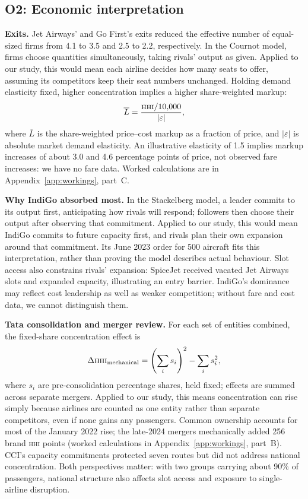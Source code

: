 \documentclass[12pt,a4paper]{article}
\newcommand{\HHI}{\textnormal{\textsc{hhi}}}
\newenvironment{mycontribution}{\par\color{blue}\captionsetup{font+={color=blue}}}{\par}
\begin{document}
\begin{mycontribution}
\subsection{O2: Economic interpretation}
\textbf{Exits.} Jet Airways' and Go First's exits reduced the effective number of equal-sized firms from 4.1 to 3.5 and 2.5 to 2.2, respectively. In the Cournot model, firms choose quantities simultaneously, taking rivals' output as given. Applied to our study, this would mean each airline decides how many seats to offer, assuming its competitors keep their seat numbers unchanged. Holding demand elasticity fixed, higher concentration implies a higher share-weighted markup:
\[
\overline{L} = \frac{\HHI/10{,}000}{|\varepsilon|},
\]
where $\overline{L}$ is the share-weighted price--cost markup as a fraction of price, and $|\varepsilon|$ is absolute market demand elasticity. An illustrative elasticity of 1.5 implies markup increases of about 3.0 and 4.6 percentage points of price, not observed fare increases: we have no fare data. Worked calculations are in Appendix~\ref{app:workings}, part~C.

\textbf{Why IndiGo absorbed most.} In the Stackelberg model, a leader commits to its output first, anticipating how rivals will respond; followers then choose their output after observing that commitment. Applied to our study, this would mean IndiGo commits to future capacity first, and rivals plan their own expansion around that commitment. Its June 2023 order for 500 aircraft fits this interpretation, rather than proving the model describes actual behaviour. Slot access also constrains rivals' expansion: SpiceJet received vacated Jet Airways slots and expanded capacity, illustrating an entry barrier. IndiGo's dominance may reflect cost leadership as well as weaker competition; without fare and cost data, we cannot distinguish them.

\textbf{Tata consolidation and merger review.} For each set of entities combined, the fixed-share concentration effect is
\[
\Delta\HHI_{\text{mechanical}} = \left(\sum_i s_i\right)^2 - \sum_i s_i^2,
\]
where $s_i$ are pre-consolidation percentage shares, held fixed; effects are summed across separate mergers. Applied to our study, this means concentration can rise simply because airlines are counted as one entity rather than separate competitors, even if none gains any passengers. Common ownership accounts for most of the January 2022 rise; the late-2024 mergers mechanically added 256 brand \HHI{} points (worked calculations in Appendix~\ref{app:workings}, part~B). CCI's capacity commitments protected seven routes but did not address national concentration. Both perspectives matter: with two groups carrying about 90\% of passengers, national structure also affects slot access and exposure to single-airline disruption.


\end{mycontribution}
\end{document}
